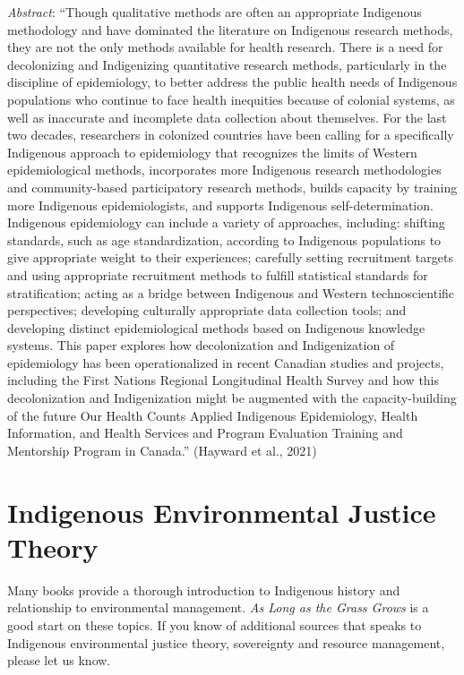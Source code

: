 \documentclass[
  11pt,
  paperpaper,
  openany]{book}
\begin{document}
\emph{Abstract}: ``Though qualitative methods are often an appropriate Indigenous methodology and have dominated the literature on Indigenous research methods, they are not the only methods available for health research. There is a need for decolonizing and Indigenizing quantitative research methods, particularly in the discipline of epidemiology, to better address the public health needs of Indigenous populations who continue to face health inequities because of colonial systems, as well as inaccurate and incomplete data collection about themselves. For the last two decades, researchers in colonized countries have been calling for a specifically Indigenous approach to epidemiology that recognizes the limits of Western epidemiological methods, incorporates more Indigenous research methodologies and community-based participatory research methods, builds capacity by training more Indigenous epidemiologists, and supports Indigenous self-determination. Indigenous epidemiology can include a variety of approaches, including: shifting standards, such as age standardization, according to Indigenous populations to give appropriate weight to their experiences; carefully setting recruitment targets and using appropriate recruitment methods to fulfill statistical standards for stratification; acting as a bridge between Indigenous and Western technoscientific perspectives; developing culturally appropriate data collection tools; and developing distinct epidemiological methods based on Indigenous knowledge systems. This paper explores how decolonization and Indigenization of epidemiology has been operationalized in recent Canadian studies and projects, including the First Nations Regional Longitudinal Health Survey and how this decolonization and Indigenization might be augmented with the capacity-building of the future Our Health Counts Applied Indigenous Epidemiology, Health Information, and Health Services and Program Evaluation Training and Mentorship Program in Canada.'' (Hayward et al., 2021)

\hypertarget{indigenous-environmental-justice-theory}{%
\section{Indigenous Environmental Justice Theory}\label{indigenous-environmental-justice-theory}}

Many books provide a thorough introduction to Indigenous history and relationship to environmental management. \emph{As Long as the Grass Grows} is a good start on these topics. If you know of additional sources that speaks to Indigenous environmental justice theory, sovereignty and resource management, please let us know.
\end{document}
